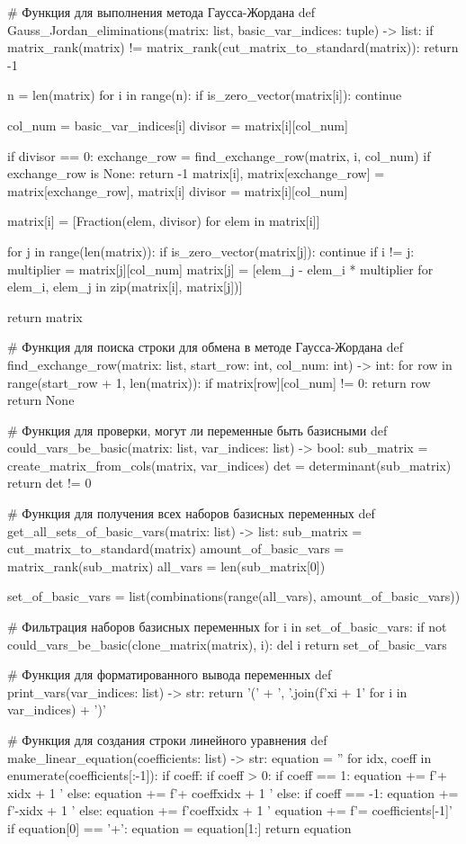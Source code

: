 \documentclass{report}
\begin{document}
\begin{code}
# Функция для выполнения метода Гаусса-Жордана
def Gauss_Jordan_eliminations(matrix: list, basic_var_indices: tuple) -> list:
   if matrix_rank(matrix) != matrix_rank(cut_matrix_to_standard(matrix)):
	   return -1

   n = len(matrix)
   for i in range(n):
	   if is_zero_vector(matrix[i]):
		   continue

	   col_num = basic_var_indices[i]
	   divisor = matrix[i][col_num]

	   if divisor == 0:
		   exchange_row = find_exchange_row(matrix, i, col_num)
		   if exchange_row is None:
			   return -1
		   matrix[i], matrix[exchange_row] = matrix[exchange_row], matrix[i]
		   divisor = matrix[i][col_num]

	   matrix[i] = [Fraction(elem, divisor) for elem in matrix[i]]

	   for j in range(len(matrix)):
		   if is_zero_vector(matrix[j]):
			   continue
		   if i != j:
			   multiplier = matrix[j][col_num]
			   matrix[j] = [elem_j - elem_i * multiplier for elem_i, elem_j in zip(matrix[i], matrix[j])]

   return matrix

# Функция для поиска строки для обмена в методе Гаусса-Жордана
def find_exchange_row(matrix: list, start_row: int, col_num: int) -> int:
   for row in range(start_row + 1, len(matrix)):
	   if matrix[row][col_num] != 0:
		   return row
   return None

# Функция для проверки, могут ли переменные быть базисными
def could_vars_be_basic(matrix: list, var_indices: list) -> bool:
   sub_matrix = create_matrix_from_cols(matrix, var_indices)
   det = determinant(sub_matrix)
   return det != 0

# Функция для получения всех наборов базисных переменных
def get_all_sets_of_basic_vars(matrix: list) -> list:
   sub_matrix = cut_matrix_to_standard(matrix)
   amount_of_basic_vars = matrix_rank(sub_matrix)
   all_vars = len(sub_matrix[0])

   set_of_basic_vars = list(combinations(range(all_vars), amount_of_basic_vars))

   # Фильтрация наборов базисных переменных
   for i in set_of_basic_vars:
	   if not could_vars_be_basic(clone_matrix(matrix), i):
		   del i
   return set_of_basic_vars

# Функция для форматированного вывода переменных
def print_vars(var_indices: list) -> str:
   return '(' + ', '.join(f'x{i + 1}' for i in var_indices) + ')'

# Функция для создания строки линейного уравнения
def make_linear_equation(coefficients: list) -> str:
   equation = ''
   for idx, coeff in enumerate(coefficients[:-1]):
	   if coeff:
		   if coeff > 0:
			   if coeff == 1:
				   equation += f'+ x{idx + 1} '
			   else:
				   equation += f'+ {coeff}x{idx + 1} '
		   else:
			   if coeff == -1:
				   equation += f'-x{idx + 1} '
			   else:
				   equation += f'{coeff}x{idx + 1} '
   equation += f'= {coefficients[-1]}'
   if equation[0] == '+':
	   equation = equation[1:]
   return equation


\end{code}
\end{document}
